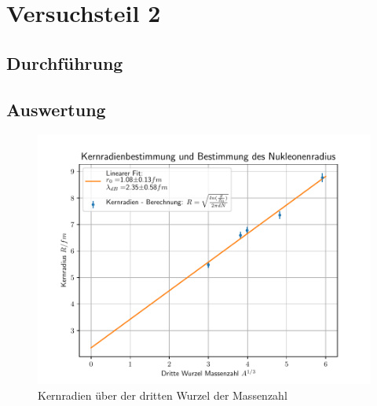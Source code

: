 \section{Versuchsteil 2}
\subsection{Durchführung}
\subsection{Auswertung}


\begin{figure}[htbp]  
     \includegraphics{kernradien.pdf}
  \caption{Kernradien über der dritten Wurzel der Massenzahl}
  \label{kernradien}
\end{figure}
